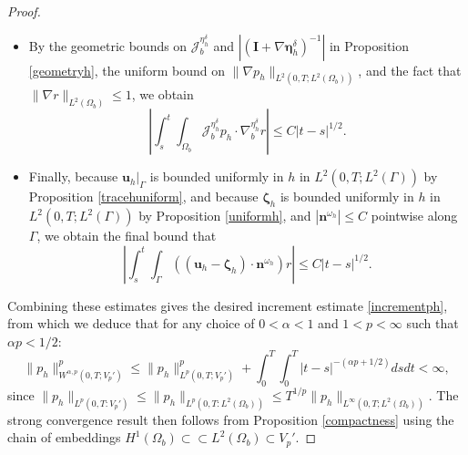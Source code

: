 \documentclass[11pt]{article}
\newcommand{\bd}{\boldsymbol}
\theoremstyle{definition}
\begin{document}
\begin{proof}
\begin{itemize}
\item By the geometric bounds on $\mathcal{J}^{\eta^{\delta}_{h}}_{b}$ and $|(\bd{I} + \nabla \bd{\eta}^{\delta}_{h})^{-1}|$ in Proposition \ref{geometryh}, the uniform bound on $\|\nabla p_{h}\|_{L^{2}(0, T; L^{2}(\Omega_{b}))}$, and the fact that $\|\nabla r\|_{L^{2}(\Omega_{b})} \le 1$, we obtain
\begin{equation*}
\left|\int_{s}^{t} \int_{\Omega_{b}} \mathcal{J}^{\eta^{\delta}_{h}}_{b} p_{h} \cdot \nabla^{\eta^{\delta}_{h}}_{b} r\right| \le C|t - s|^{1/2}.
\end{equation*}
\item Finally, because $\bd{u}_{h}|_{\Gamma}$ is bounded uniformly in $h$ in $L^{2}(0, T; L^{2}(\Gamma))$ by Proposition \ref{tracehuniform}, and because $\bd{\zeta}_{h}$ is bounded uniformly in $h$ in $L^{2}(0, T; L^{2}(\Gamma))$ by Proposition \ref{uniformh}, and $|\bd{n}^{\omega_{h}}| \le C$ pointwise along $\Gamma$, we obtain the final bound that 
\begin{equation*}
\left|\int_{s}^{t} \int_{\Gamma} ((\bd{u}_{h} - \bd{\zeta}_{h}) \cdot \bd{n}^{\omega_{h}}) r\right| \le C|t - s|^{1/2}.
\end{equation*}
\end{itemize}
Combining these estimates gives the desired increment estimate \eqref{incrementph}, from which we deduce that for any choice of $0 < \alpha < 1$ and $1 < p < \infty$ such that $\alpha p < 1/2$:
\begin{equation*}
\|p_{h}\|_{W^{\alpha, p}(0, T; V_{p}')}^{p} \le \|p_{h}\|^{p}_{L^{p}(0, T; V_{p}')} + \int_{0}^{T} \int_{0}^{T} |t - s|^{-(\alpha p + 1/2)} ds dt < \infty,
\end{equation*}
since $\|p_{h}\|_{L^{p}(0, T: V_{p}')} \le \|p_{h}\|_{L^{p}(0, T: L^{2}(\Omega_{b}))} \le T^{1/p} \|p_{h}\|_{L^{\infty}(0, T; L^{2}(\Omega_{b}))}$. The strong convergence result then follows from Proposition \ref{compactness} using the chain of embeddings $H^{1}(\Omega_{b}) \subset \subset L^{2}(\Omega_{b}) \subset V_{p}'$. 
\end{proof}

\medskip
\end{document}
